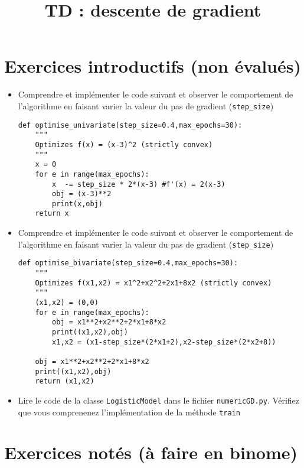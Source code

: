 \documentclass[a4paper,12pts]{article}
\title{TD : descente de gradient}
\date{ }
\begin{document}
\maketitle

\section{Exercices introductifs (non évalués)}

\begin{itemize}
\item Comprendre et implémenter le code suivant et observer le comportement de
  l'algorithme en faisant varier la valeur du pas de gradient (\verb+step_size+)
\begin{verbatim}
def optimise_univariate(step_size=0.4,max_epochs=30):
    """
    Optimizes f(x) = (x-3)^2 (strictly convex)
    """    
    x = 0
    for e in range(max_epochs):
        x  -= step_size * 2*(x-3) #f'(x) = 2(x-3)
        obj = (x-3)**2
        print(x,obj)
    return x
\end{verbatim}
\item Comprendre et implémenter le code suivant et observer le comportement de
  l'algorithme en faisant varier la valeur du pas de gradient
  (\verb+step_size+)
\begin{verbatim}
def optimise_bivariate(step_size=0.4,max_epochs=30):
    """
    Optimizes f(x1,x2) = x1^2+x2^2+2x1+8x2 (strictly convex)
    """    
    (x1,x2) = (0,0)
    for e in range(max_epochs):
        obj = x1**2+x2**2+2*x1+8*x2
        print((x1,x2),obj)
        x1,x2 = (x1-step_size*(2*x1+2),x2-step_size*(2*x2+8))

    obj = x1**2+x2**2+2*x1+8*x2
    print((x1,x2),obj)
    return (x1,x2)
\end{verbatim}
\item Lire le code de la classe \verb+LogisticModel+ dans le fichier
  \verb+numericGD.py+. Vérifiez que vous comprenenez l'implémentation de la méthode \verb+train+
\end{itemize}


\section{Exercices notés (à faire en binome)}
\end{document}
